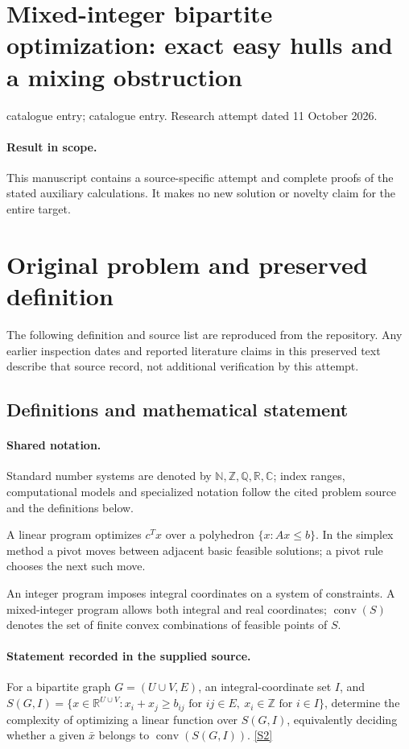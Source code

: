 \documentclass[11pt]{article}
\begin{document}
\section*{Mixed-integer bipartite optimization: exact easy hulls and a mixing obstruction}
\noindent catalogue entry; catalogue entry. Research attempt dated 11 October 2026.
\paragraph{Result in scope.}This manuscript contains a source-specific attempt and complete proofs of the stated auxiliary calculations. It makes no new solution or novelty claim for the entire target.
\section{Original problem and preserved definition}
The following definition and source list are reproduced from the repository. Any earlier inspection dates and reported literature claims in this preserved text describe that source record, not additional verification by this attempt.
\subsection{Definitions and mathematical statement}

\paragraph{Shared notation.}Standard number systems are denoted by $\mathbb N,\mathbb Z,\mathbb Q,\mathbb R,\mathbb C$; index ranges, computational models and specialized notation follow the cited problem source and the definitions below.


A linear program optimizes $c^Tx$ over a polyhedron $\{x:Ax\leq b\}$. In the simplex method a pivot moves between adjacent basic feasible solutions; a pivot rule chooses the next such move.

An integer program imposes integral coordinates on a system of constraints. A mixed-integer program allows both integral and real coordinates; $\operatorname{conv}(S)$ denotes the set of finite convex combinations of feasible points of $S$.
\paragraph{Statement recorded in the supplied source.}
For a bipartite graph $G=(U\cup V,E)$, an integral-coordinate set $I$, and $S(G,I)=\{x\in\mathbb{R}^{U\cup V}:x_i+x_j\geq b_{ij}\text{ for }ij\in E,\ x_i\in\mathbb{Z}\text{ for }i\in I\}$, determine the complexity of optimizing a linear function over $S(G,I)$, equivalently deciding whether a given $\bar{x}$ belongs to $\operatorname{conv}(S(G,I))$. \href{https://doi.org/10.4171/owr/2008/51}{[S2]}
\end{document}
